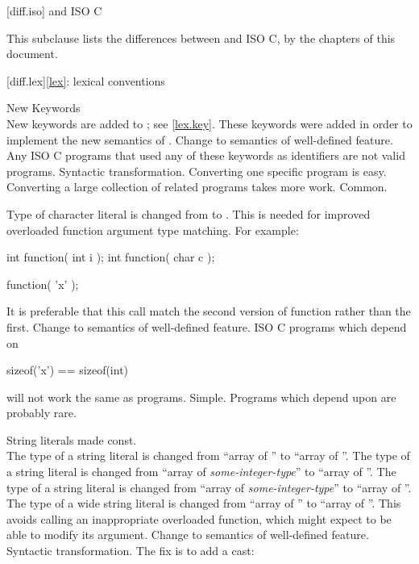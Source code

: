 
[diff.iso]{\Cpp{} and ISO C}

\pnum
{}%
This subclause lists the differences between \Cpp{} and
ISO C, by the chapters of this document.

[diff.lex]{\ref{lex}: lexical conventions}

\change New Keywords\\
New keywords are added to \Cpp{};
see \ref{lex.key}.
\rationale
These keywords were added in order to implement the new
semantics of \Cpp{}.
\effect
Change to semantics of well-defined feature.
Any ISO C programs that used any of these keywords as identifiers
are not valid \Cpp{} programs.
\difficulty
Syntactic transformation.
Converting one specific program is easy.
Converting a large collection
of related programs takes more work.
\howwide
Common.

\change Type of character literal is changed from  to .
\rationale
This is needed for improved overloaded function argument type
matching.
For example:

\begin{codeblock}
int function( int i );
int function( char c );

function( 'x' );
\end{codeblock}

It is preferable that this call match the second version of
function rather than the first.
\effect
Change to semantics of well-defined feature.
ISO C programs which depend on

\begin{codeblock}
sizeof('x') == sizeof(int)
\end{codeblock}

will not work the same as \Cpp{} programs.
\difficulty
Simple.
\howwide
Programs which depend upon  are probably rare.

\change String literals made const.\\
The type of a string literal is changed
from ``array of ''
to ``array of ''.
The type of a  string literal is changed
from ``array of \textit{some-integer-type}''
to ``array of ''.
The type of a  string literal is changed
from ``array of \textit{some-integer-type}''
to ``array of ''.
The type of a wide string literal is changed
from ``array of ''
to ``array of ''.
\rationale
This avoids calling an inappropriate overloaded function,
which might expect to be able to modify its argument.
\effect
Change to semantics of well-defined feature.
\difficulty
Syntactic transformation. The fix is to add a cast:

